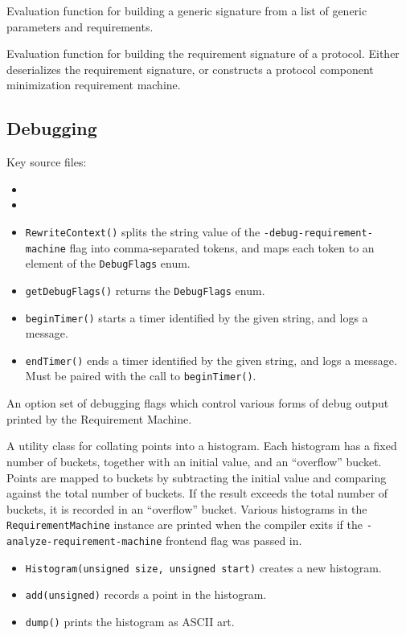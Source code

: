 \documentclass[../generics]{subfiles}
\begin{document}
Evaluation function for building a generic signature from a list of generic parameters and requirements.

Evaluation function for building the requirement signature of a protocol. Either deserializes the requirement signature, or constructs a protocol component minimization requirement machine.

\subsection*{Debugging}

Key source files:
\begin{itemize}
\item {}
\item {}
\end{itemize}

\begin{itemize}
\item \texttt{RewriteContext()} splits the string value of the \texttt{-debug-requirement-machine} flag into comma-separated tokens, and maps each token to an element of the \texttt{DebugFlags} enum.
\item \texttt{getDebugFlags()} returns the \texttt{DebugFlags} enum.
\item \texttt{beginTimer()} starts a timer identified by the given string, and logs a message.
\item \texttt{endTimer()} ends a timer identified by the given string, and logs a message. Must be paired with the call to \texttt{beginTimer()}.
\end{itemize}


An option set of debugging flags which control various forms of debug output printed by the Requirement Machine.

%
A utility class for collating points into a histogram. Each histogram has a fixed number of buckets, together with an initial value, and an ``overflow'' bucket. Points are mapped to buckets by subtracting the initial value and comparing against the total number of buckets. If the result exceeds the total number of buckets, it is recorded in an ``overflow'' bucket. Various histograms in the \texttt{RequirementMachine} instance are printed when the compiler exits if the \texttt{-analyze-requirement-machine} frontend flag was passed in.
\begin{itemize}
\item \texttt{Histogram(unsigned size, unsigned start)} creates a new histogram.
\item \texttt{add(unsigned)} records a point in the histogram.
\item \texttt{dump()} prints the histogram as ASCII art.
\end{itemize}
\end{document}
